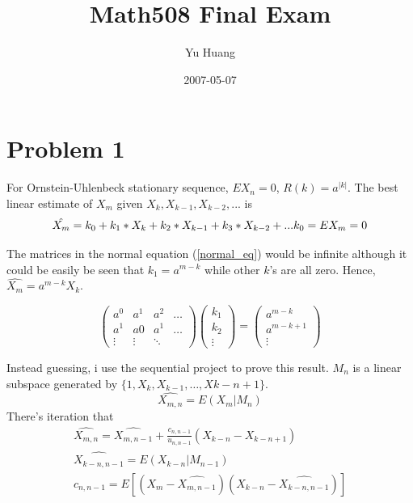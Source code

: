 \documentclass[a4paper,10pt]{article}
\title{Math508 Final Exam}
\author{Yu Huang}
\date{2007-05-07}
\begin{document}
\maketitle


\section{Problem 1}
For Ornstein-Uhlenbeck stationary sequence, $E X_n=0$, $R(k) = a^{|k|}$. The best linear estimate of $X_m$ given $X_k, X_{k-1}, X_{k-2}, ...$ is
\begin{equation}
\hat{X_m} = k_0 + k_1*X_k + k_2*X_{k-1} + k_3*X_{k-2} + ... \\
k_0 = EX_m = 0
\end{equation}

The matrices in the normal equation (\ref{normal_eq}) would be infinite although it could be easily be seen that $k_1=a^{m-k}$ while other $k$'s are all zero. Hence, $\hat{X_m} = a^{m-k}X_k$.

\begin{equation} \label{normal_eq}
\left( \begin{array}{cccc}
a^{0} & a^{1} & a^{2} & \ldots \\
a^{1} & a{0} & a^{1} & \ldots \\
\vdots & \vdots & \ddots
\end{array} \right)
\left(\begin{array}{c}
k_1 \\
k_2 \\
\vdots
\end{array} \right) = 
\left( \begin{array}{c}
a^{m-k} \\
a^{m-k+1} \\
\vdots
\end{array} \right)
\end{equation}


Instead guessing, i use the sequential project to prove this result. $M_n$ is a linear subspace generated by $\{1, X_k, X_{k-1}, \ldots, X{k-n+1}\}$.
\begin{equation}
\hat{X_{m,n}} = E(X_m|M_n)
\end{equation}
There's iteration that 
\begin{eqnarray}
\hat{X_{m,n}} = \hat{X_{m,n-1}} + \frac{c_{n,n-1}}{u_{n,n-1}}(X_{k-n}-X_{k-n+1}) \nonumber \\
\hat{X_{k-n,n-1}} = E(X_{k-n}|M_{n-1}) \nonumber \\
c_{n,n-1} = E[(X_m - \hat{X_{m,n-1}})(X_{k-n}-\hat{X_{k-n,n-1}})] \nonumber
\end{eqnarray}
\end{document}
